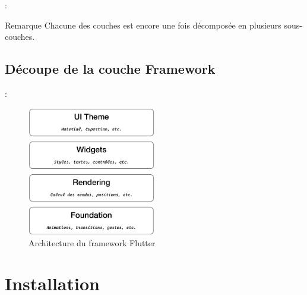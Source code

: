 \documentclass[10pt]{beamer}
\begin{document}
\begin{frame}[fragile,t]{\secname : \subsecname}
    \begin{block}{Remarque}
        Chacune des couches est encore une fois décomposée en plusieurs sous-couches.
    \end{block}
\end{frame}

\subsection{Découpe de la couche Framework}
\begin{frame}[fragile,t]{\secname : \subsecname}
    \begin{figure}[H]
        \begin{center}
            \includegraphics[width=0.5\textwidth]{../assets/img/architecture-framework.eps}
            \caption*{Architecture du framework Flutter \cite{raywenderlich2020flutter}}
            \label{Fig:architecture-framework}
        \end{center}
    \end{figure}
\end{frame}

\section{Installation}
\end{document}
